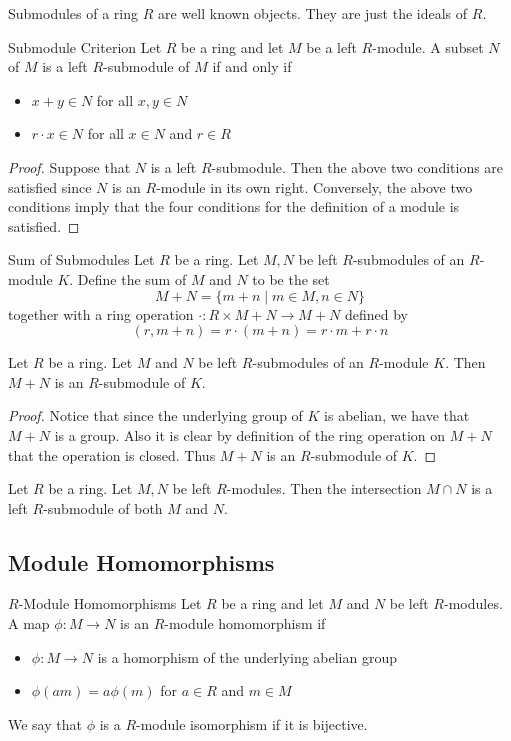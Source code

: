 \documentclass[a4paper]{article}
\begin{document}
Submodules of a ring $R$ are well known objects. They are just the ideals of $R$. 

\begin{prp}{Submodule Criterion}{} Let $R$ be a ring and let $M$ be a left $R$-module. A subset $N$ of $M$ is a left $R$-submodule of $M$ if and only if
\begin{itemize}
\item $x+y\in N$ for all $x,y\in N$
\item $r\cdot x\in N$ for all $x\in N$ and $r\in R$
\end{itemize} 
\begin{proof}
Suppose that $N$ is a left $R$-submodule. Then the above two conditions are satisfied since $N$ is an $R$-module in its own right. Conversely, the above two conditions imply that the four conditions for the definition of a module is satisfied. 
\end{proof}
\end{prp}

\begin{defn}{Sum of Submodules}{} Let $R$ be a ring. Let $M,N$ be left $R$-submodules of an $R$-module $K$. Define the sum of $M$ and $N$ to be the set $$M+N=\{m+n\;|\;m\in M,n\in N\}$$ together with a ring operation $\cdot:R\times M+N\to M+N$ defined by $$(r,m+n)=r\cdot(m+n)=r\cdot m+r\cdot n$$
\end{defn}

\begin{lmm}{}{} Let $R$ be a ring. Let $M$ and $N$ be left $R$-submodules of an $R$-module $K$. Then $M+N$ is an $R$-submodule of $K$. 
\begin{proof}
Notice that since the underlying group of $K$ is abelian, we have that $M+N$ is a group. Also it is clear by definition of the ring operation on $M+N$ that the operation is closed. Thus $M+N$ is an $R$-submodule of $K$. 
\end{proof}
\end{lmm}

\begin{lmm}{}{} Let $R$ be a ring. Let $M,N$ be left $R$-modules. Then the intersection $M\cap N$ is a left $R$-submodule of both $M$ and $N$. 
\end{lmm}

\subsection{Module Homomorphisms}
\begin{defn}{$R$-Module Homomorphisms}{} Let $R$ be a ring and let $M$ and $N$ be left $R$-modules. A map $\phi:M\to N$ is an $R$-module homomorphism if 
\begin{itemize}
\item $\phi:M\to N$ is a homorphism of the underlying abelian group
\item $\phi(am)=a\phi(m)$ for $a\in R$ and $m\in M$
\end{itemize}
We say that $\phi$ is a $R$-module isomorphism if it is bijective. 
\end{defn}
\end{document}
